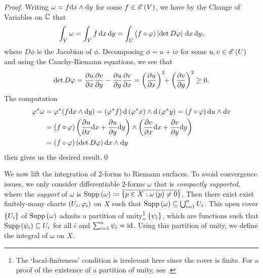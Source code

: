 \documentclass[../Moduli_Spaces_of_Riemann_Surfaces.tex]{subfiles}
\begin{document}
    \begin{proof}
        Writing $\omega=f\mathrm{d} x\wedge\mathrm{d} y$ for some $f\in\mathscr{E}\left(V\right)$, we have by the Change of Variables on $\mathbb{C}$ that
        \begin{equation*}
            \int_V\omega=\int_Vf\,\mathrm{d} x\,\mathrm{d} y=\int_U\left(f\circ\varphi\right)\left|\det D\varphi\right|\,\mathrm{d} x\,\mathrm{d} y,
        \end{equation*}
        where $D\phi$ is the Jacobian of $\phi$. Decomposing $\phi=u+iv$ for some $u,v\in\mathscr{E}\left(U\right)$ and using the Cauchy-Riemann equations, we see that
        \begin{equation*}
            \det D\varphi=\frac{\partial u}{\partial x}\frac{\partial v}{\partial y}-\frac{\partial u}{\partial y}\frac{\partial v}{\partial x}=\left(\frac{\partial u}{\partial x}\right)^2\!\!+\left(\frac{\partial v}{\partial y}\right)^2\geq0.
        \end{equation*}
        The computation
        \begin{equation*}
            \begin{aligned}
                \varphi^\ast\omega&=\varphi^\ast\!\left(f\mathrm{d} x\wedge\mathrm{d} y\right)=\left(\varphi^\ast f\right)\mathrm{d}\left(\varphi^\ast x\right)\wedge\mathrm{d}\left(\varphi^\ast y\right)=\left(f\circ\varphi\right)\mathrm{d} u\wedge \mathrm{d} v \\
                               &=\left(f\circ\varphi\right)\left(\frac{\partial u}{\partial x}\mathrm{d} x+\frac{\partial u}{\partial y}\mathrm{d} y\right)\wedge\left(\frac{\partial v}{\partial x}\mathrm{d} x+\frac{\partial v}{\partial y}\mathrm{d} y\right) \\
                               &=\left(f\circ\varphi\right)\left(\det D\varphi\right)\mathrm{d} x\wedge\mathrm{d} y
            \end{aligned}
        \end{equation*}
        then gives us the desired result.\qed
    \end{proof}
    We now lift the integration of $2$-forms to Riemann surfaces. To avoid convergence issues, we only consider differentiable $2$-forms $\omega$ that is \textit{compactly supported}, where the \textit{support} of $\omega$ is $\operatorname{Supp}\left(\omega\right)\coloneqq\overline{\left\{p\in X:\omega\left(p\right)\neq0\right\}}$. Then there exist exist finitely-many charts $\left(U_i,\varphi_i\right)$ on $X$ such that $\operatorname{Supp}\left(\omega\right)\subseteq\bigcup_{i=1}^{n}U_i$. This open cover $\left\{U_i\right\}$ of $\operatorname{Supp}\left(\omega\right)$ admits a partition of unity\footnote{The `local-finiteness' condition is irrelevant here since the cover is finite. For a proof of the existence of a partition of unity, see \cite[][Theorem 2.23]{leeSM}.} $\left\{\psi_i\right\}$, which are functions such that $\operatorname{Supp}\left(\psi_i\right)\subseteq U_i$ for all $i$ and $\sum_{i=1}^n\psi_i=\operatorname{id}$. Using this partition of unity, we define the integral of $\omega$ on $X$.
\end{document}
